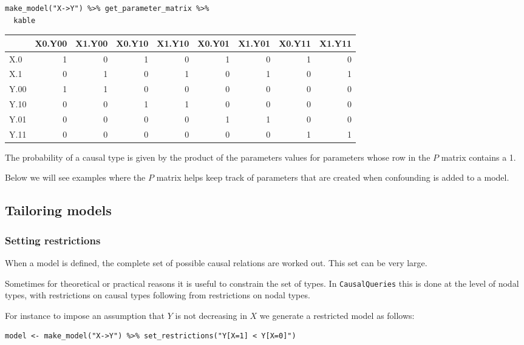 \documentclass[
  article]{jss}
\begin{document}
\begin{verbatim}
make_model("X->Y") %>% get_parameter_matrix %>%
  kable
\end{verbatim}

\begin{longtable}[]{@{}lrrrrrrrr@{}}
\toprule\noalign{}
& X0.Y00 & X1.Y00 & X0.Y10 & X1.Y10 & X0.Y01 & X1.Y01 & X0.Y11 &
X1.Y11 \\
\midrule\noalign{}
\endhead
\bottomrule\noalign{}
\endlastfoot
X.0 & 1 & 0 & 1 & 0 & 1 & 0 & 1 & 0 \\
X.1 & 0 & 1 & 0 & 1 & 0 & 1 & 0 & 1 \\
Y.00 & 1 & 1 & 0 & 0 & 0 & 0 & 0 & 0 \\
Y.10 & 0 & 0 & 1 & 1 & 0 & 0 & 0 & 0 \\
Y.01 & 0 & 0 & 0 & 0 & 1 & 1 & 0 & 0 \\
Y.11 & 0 & 0 & 0 & 0 & 0 & 0 & 1 & 1 \\
\end{longtable}

The probability of a causal type is given by the product of the
parameters values for parameters whose row in the \(P\) matrix contains
a 1.

Below we will see examples where the \(P\) matrix helps keep track of
parameters that are created when confounding is added to a model.

\hypertarget{tailoring-models}{%
\subsection{Tailoring models}\label{tailoring-models}}

\hypertarget{restrictions}{%
\subsubsection{Setting restrictions}\label{restrictions}}

When a model is defined, the complete set of possible causal relations
are worked out. This set can be very large.

Sometimes for theoretical or practical reasons it is useful to constrain
the set of types. In \texttt{CausalQueries} this is done at the level of
nodal types, with restrictions on causal types following from
restrictions on nodal types.

For instance to impose an assumption that \(Y\) is not decreasing in
\(X\) we generate a restricted model as follows:

\begin{verbatim}
model <- make_model("X->Y") %>% set_restrictions("Y[X=1] < Y[X=0]")
\end{verbatim}
\end{document}
